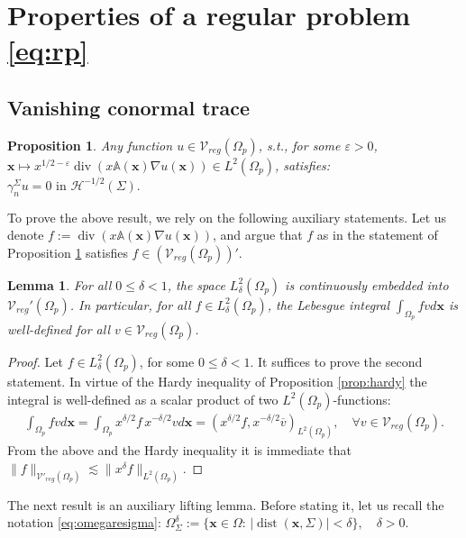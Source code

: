 \documentclass[report]{elsarticle}
\newtheorem{proposition}[theorem]{Proposition}
\newtheorem{lemma}[theorem]{Lemma}
\numberwithin{theorem}{section}
\newcommand{\bx}{\mathbf{x}}
\renewcommand{\vec}[1]{\mathbf{#1}}
\begin{document}
\section{Properties of a regular problem \eqref{eq:rp}}
\label{sec:apx_reg_pb}
\subsection{Vanishing conormal trace}
\label{appendix:conormal_trace}
\begin{proposition}
	\label{cor:uv_appx}
	Any function $u\in\mathcal{V}_{reg}(\Omega_p)$, s.t., for some $\varepsilon>0$, $\vec{x}\mapsto x^{1/2-\varepsilon}\operatorname{div}(x\mathbb{A}(\vec{x})\nabla u(\vec{x}))\in L^2(\Omega_p)$, satisfies: $
		\gamma_{n}^{\Sigma}u=0 \text{ in }\mathcal{H}^{-1/2}(\Sigma).$
\end{proposition}
To prove the above result, we rely on the following auxiliary statements. Let us denote $
	f:=\operatorname{div}(x\mathbb{A}(\vec{x})\nabla u(\vec{x}))$, 
and argue that $f$ as in the statement of Proposition \ref{cor:uv_appx} satisfies $f\in (\mathcal{V}_{reg}(\Omega_p))'$.
\begin{lemma}
	\label{lem:f_belongs_vreg}
	For all $0\leq \delta<1$, the space $L^2_{\delta}(\Omega_p)$ is continuously embedded into $\mathcal{V}_{reg}'(\Omega_p)$. In particular, for all $f\in L^2_{\delta}(\Omega_p)$, the Lebesgue integral $\int_{\Omega_p}fvd\vec{x}$ is well-defined for all $v\in \mathcal{V}_{reg}(\Omega_p)$. 
\end{lemma}
\begin{proof}
Let $f\in L^2_{\delta}(\Omega_p)$, for some $0\leq \delta<1$. It suffices to prove the second statement. 
In virtue of the Hardy inequality of Proposition \ref{prop:hardy} the integral is well-defined as a scalar product of two $L^2(\Omega_p)$-functions:
	\begin{align}
		\label{eq:two_funcs}
		\int_{\Omega_p}fvd\vec{x}=\int_{\Omega_p}x^{\delta/2}f\,x^{-\delta/2}v d\vec{x}=(x^{\delta/2}f, x^{-\delta/2}\overline{v})_{L^2(\Omega_p)}, \quad \forall v\in \mathcal{V}_{reg}(\Omega_p).
	\end{align}
From the above and the Hardy inequality it is immediate that $\|f\|_{\mathcal{V}'_{reg}(\Omega_p)}\lesssim \|x^{\delta}f\|_{L^2(\Omega_p)}$. 
\end{proof}
The next result is an auxiliary lifting lemma. Before stating it, let us recall the notation  \eqref{eq:omegaresigma}: $
	\Omega_{\Sigma}^{\delta}:=\{\bx\in \Omega: \, |\operatorname{dist}(\vec{x},\Sigma)|<\delta\}, \quad \delta>0.$
\end{document}
